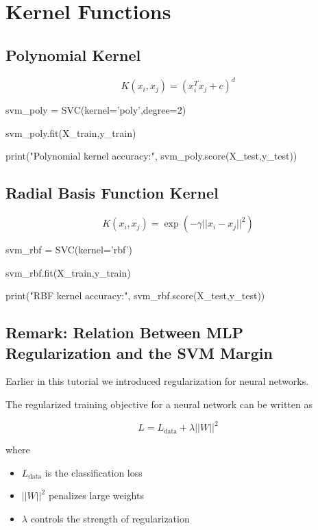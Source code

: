 \documentclass[12pt]{article}
\begin{document}
\section{Kernel Functions}

\subsection{Polynomial Kernel}

\[
K(x_i,x_j)=(x_i^Tx_j+c)^d
\]

\begin{py-box}
svm_poly = SVC(kernel='poly',degree=2)

svm_poly.fit(X_train,y_train)

print("Polynomial kernel accuracy:",
svm_poly.score(X_test,y_test))
\end{py-box}

\subsection{Radial Basis Function Kernel}

\[
K(x_i,x_j)=
\exp(-\gamma||x_i-x_j||^2)
\]

\begin{py-box}
svm_rbf = SVC(kernel='rbf')

svm_rbf.fit(X_train,y_train)

print("RBF kernel accuracy:",
svm_rbf.score(X_test,y_test))
\end{py-box}


\subsection{Remark: Relation Between MLP Regularization and the SVM Margin}

Earlier in this tutorial we introduced regularization for neural networks.

The regularized training objective for a neural network can be written as

\[
L = L_{\text{data}} + \lambda ||W||^2
\]

where

\begin{itemize}
\item $L_{\text{data}}$ is the classification loss
\item $||W||^2$ penalizes large weights
\item $\lambda$ controls the strength of regularization
\end{itemize}
\end{document}
